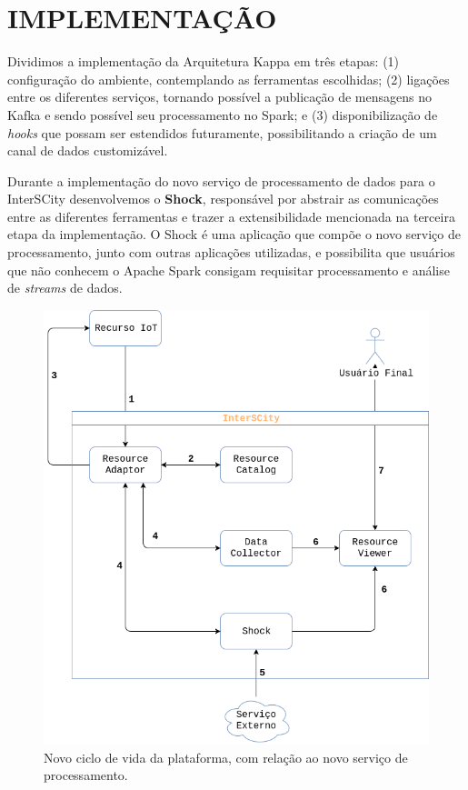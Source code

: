 \section{IMPLEMENTAÇÃO}

Dividimos a implementação da Arquitetura Kappa em três etapas:
(1) configuração do ambiente, contemplando as ferramentas escolhidas;
(2) ligações entre os diferentes serviços, tornando possível a publicação de
    mensagens no Kafka e sendo possível seu processamento no Spark; e
(3) disponibilização de \textit{hooks} que possam ser estendidos futuramente,
    possibilitando a criação de um canal de dados customizável.

Durante a implementação do novo serviço de processamento de dados para o
InterSCity desenvolvemos o \textbf{Shock}, responsável por abstrair as
comunicações entre as diferentes ferramentas e trazer a extensibilidade mencionada
na terceira etapa da implementação. O Shock é uma aplicação que compõe o
novo serviço de processamento, junto com outras aplicações utilizadas, e
possibilita que usuários que não conhecem o Apache Spark consigam requisitar
processamento e análise de \textit{streams} de dados.

\begin{figure}[hbt]
  \centering
    \includegraphics[scale=0.45]{figuras/shock_usage.png}
    \caption{Novo ciclo de vida da plataforma, com relação ao novo serviço de processamento.}
  \label{fig:shock_usage}
\end{figure}

